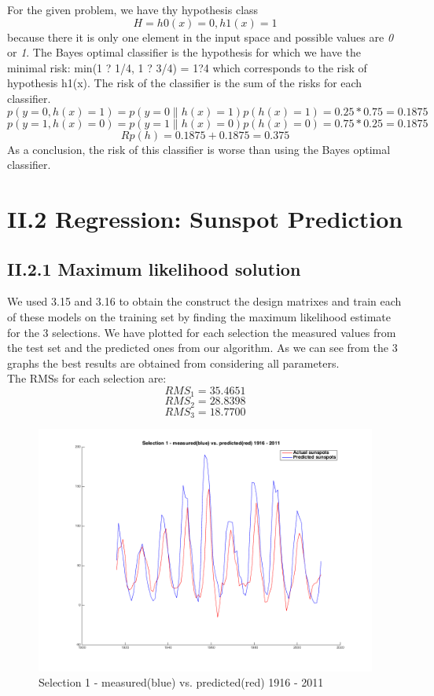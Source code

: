 \documentclass{article}      %
\begin{document}
For the given problem, we have thy hypothesis class 
\[H={h0(x)=0, h1(x)=1} \]
 because there it is only one element in the input space and possible values are \emph{0} or \emph{1}. The Bayes optimal classifier is the hypothesis for which we have the minimal risk: min({1 ? 1/4, 1 ? 3/4}) = 1?4 which corresponds to the risk of hypothesis h1(x). The risk of the classifier is the sum of the risks for each classifier. 
\[p(y=0, h(x)=1) = p(y=0 \| h(x)=1)p(h(x)=1) = 0.25 * 0.75 = 0.1875\] 
\[p(y=1, h(x)=0) = p(y=1 \| h(x)=0)p(h(x)=0) = 0.75 * 0.25 = 0.1875\] 
\[Rp(h) = 0.1875 + 0.1875 = 0.375\] 
As a conclusion, the risk of this classifier is worse than using the Bayes optimal classifier.\
\section*{II.2 Regression: Sunspot Prediction}

\subsection*{II.2.1 Maximum likelihood solution}

We used 3.15 and 3.16 to obtain the construct the design matrixes and train each of these models on the training set by finding the maximum likelihood estimate for the 3 selections. We have plotted for each selection the measured values from the test set and the predicted ones from our algorithm. As we can see from the 3 graphs the best results are obtained from considering all parameters.\\

The RMSs for each selection are: \\
\[ RMS_1 = 35.4651\]
\[ RMS_2 = 28.8398\]
\[ RMS_3 = 18.7700\]


\begin{figure}[ht]
\centering
\includegraphics[scale=.4]{img/pred1}
\caption{Selection 1 - measured(blue) vs. predicted(red) 1916 - 2011 \label{overflow}}
\end{figure}
\end{document}
